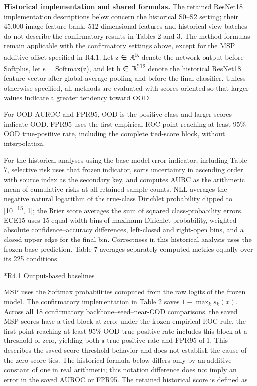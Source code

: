 \documentclass[11pt,a4paper]{article}
\makeatletter
\renewcommand\subsection{\@startsection{subsection}{2}{\z@}{-1.8ex plus -.5ex minus -.2ex}{.7ex plus .2ex}{\normalfont\normalsize\bfseries\raggedright}}
\makeatother
\begin{document}
\noindent\textbf{Historical implementation and shared formulas.} The retained ResNet18 implementation descriptions below concern the historical S0--S2 setting; their 45,000-image feature bank, 512-dimensional features and historical view batches do not describe the confirmatory results in Tables 2 and 3. The method formulas remain applicable with the confirmatory settings above, except for the MSP additive offset specified in R4.1. Let z ∈ ℝ\textsuperscript{K} denote the network output before Softplus, let s = Softmax(z), and let h ∈ ℝ\textsuperscript{512} denote the historical ResNet18 feature vector after global average pooling and before the final classifier. Unless otherwise specified, all methods are evaluated with scores oriented so that larger values indicate a greater tendency toward OOD.

For OOD AUROC and FPR95, OOD is the positive class and larger scores indicate OOD. FPR95 uses the first empirical ROC point reaching at least 95\% OOD true-positive rate, including the complete tied-score block, without interpolation.

For the historical analyses using the base-model error indicator, including Table 7, selective risk uses that frozen indicator, sorts uncertainty in ascending order with source index as the secondary key, and computes AURC as the arithmetic mean of cumulative risks at all retained-sample counts. NLL averages the negative natural logarithm of the true-class Dirichlet probability clipped to {[}10\textsuperscript{−15}, 1{]}; the Brier score averages the sum of squared class-probability errors. ECE15 uses 15 equal-width bins of maximum Dirichlet probability, weighted absolute confidence--accuracy differences, left-closed and right-open bins, and a closed upper edge for the final bin. Correctness in this historical analysis uses the frozen base prediction. Table 7 averages separately computed metrics equally over its 225 conditions.

\subsection*{R4.1 Output-based baselines}\label{s4.1-output-based-baselines}

MSP uses the Softmax probabilities computed from the raw logits of the frozen model. The confirmatory implementation in Table 2 saves $1-\max_k s_k(x)$. Across all 18 confirmatory backbone--seed--near-OOD comparisons, the saved MSP scores have a tied block at zero; under the frozen empirical ROC rule, the first point reaching at least 95\% OOD true-positive rate includes this block at a threshold of zero, yielding both a true-positive rate and FPR95 of 1. This describes the saved-score threshold behavior and does not establish the cause of the zero-score ties. The historical formula below differs only by an additive constant of one in real arithmetic; this notation difference does not imply an error in the saved AUROC or FPR95. The retained historical score is defined as
\end{document}
